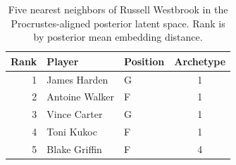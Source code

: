 \begin{table}[htbp]
  \centering\small
  \begin{tabular}{rllc}
    \toprule
    Rank & Player & Position & Archetype \\
    \midrule
    1 & James Harden & G & 1 \\
    2 & Antoine Walker & F & 1 \\
    3 & Vince Carter & G & 1 \\
    4 & Toni Kukoc & F & 1 \\
    5 & Blake Griffin & F & 4 \\
    \bottomrule
  \end{tabular}
  \caption{Five nearest neighbors of Russell Westbrook in the Procrustes-aligned posterior latent space. Rank is by posterior mean embedding distance.}
  \label{tab:Russell_Westbrook_neighbors}
\end{table}

